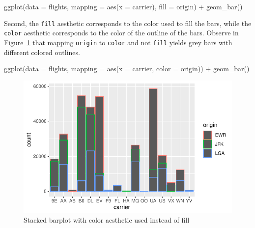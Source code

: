 \documentclass[
  letterpaper,
  DIV=11,
  numbers=noendperiod]{scrreprt}
\newenvironment{Shaded}{\begin{snugshade}}{\end{snugshade}}
\newcommand{\AttributeTok}[1]{\textcolor[rgb]{0.40,0.45,0.13}{#1}}
\newcommand{\FunctionTok}[1]{\textcolor[rgb]{0.28,0.35,0.67}{#1}}
\newcommand{\NormalTok}[1]{\textcolor[rgb]{0.00,0.23,0.31}{#1}}
\newcommand{\SpecialCharTok}[1]{\textcolor[rgb]{0.37,0.37,0.37}{#1}}
\theoremstyle{definition}
\theoremstyle{remark}
\begin{document}
\begin{Shaded}
\begin{Highlighting}[]
\FunctionTok{ggplot}\NormalTok{(}\AttributeTok{data =}\NormalTok{ flights, }\AttributeTok{mapping =} \FunctionTok{aes}\NormalTok{(}\AttributeTok{x =}\NormalTok{ carrier), }\AttributeTok{fill =}\NormalTok{ origin) }\SpecialCharTok{+}
  \FunctionTok{geom\_bar}\NormalTok{()}
\end{Highlighting}
\end{Shaded}

Second, the \texttt{fill} aesthetic corresponds to the color used to
fill the bars, while the \texttt{color} aesthetic corresponds to the
color of the outline of the bars. Observe in
Figure~\ref{fig-flights-stacked-bar-color} that mapping \texttt{origin}
to \texttt{color} and not \texttt{fill} yields grey bars with different
colored outlines.

\begin{Shaded}
\begin{Highlighting}[]
\FunctionTok{ggplot}\NormalTok{(}\AttributeTok{data =}\NormalTok{ flights, }\AttributeTok{mapping =} \FunctionTok{aes}\NormalTok{(}\AttributeTok{x =}\NormalTok{ carrier, }\AttributeTok{color =}\NormalTok{ origin)) }\SpecialCharTok{+}
  \FunctionTok{geom\_bar}\NormalTok{()}
\end{Highlighting}
\end{Shaded}

\begin{figure}[H]

{\centering \includegraphics{02-visualization_files/figure-pdf/fig-flights-stacked-bar-color-1.pdf}

}

\caption{\label{fig-flights-stacked-bar-color}Stacked barplot with color
aesthetic used instead of fill}

\end{figure}
\end{document}
